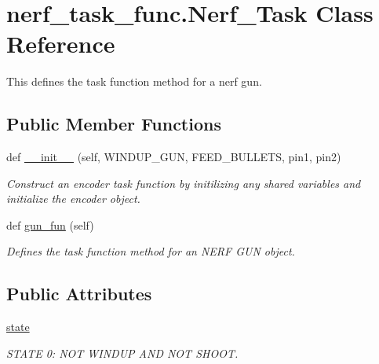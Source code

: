 \hypertarget{classnerf__task__func_1_1Nerf__Task}{}\section{nerf\+\_\+task\+\_\+func.\+Nerf\+\_\+\+Task Class Reference}
\label{classnerf__task__func_1_1Nerf__Task}


This defines the task function method for a nerf gun.  


\subsection*{Public Member Functions}
\begin{DoxyCompactItemize}
\item 
def \hyperlink{classnerf__task__func_1_1Nerf__Task_a073f35baf65e032a886807ea445eb8a9}{\+\_\+\+\_\+init\+\_\+\+\_\+} (self, W\+I\+N\+D\+U\+P\+\_\+\+G\+UN, F\+E\+E\+D\+\_\+\+B\+U\+L\+L\+E\+TS, pin1, pin2)
\begin{DoxyCompactList}\small\item\em Construct an encoder task function by initilizing any shared variables and initialize the encoder object. \end{DoxyCompactList}\item 
def \hyperlink{classnerf__task__func_1_1Nerf__Task_aa555816a1725c1f62a36e28b6d70ea87}{gun\+\_\+fun} (self)\hypertarget{classnerf__task__func_1_1Nerf__Task_aa555816a1725c1f62a36e28b6d70ea87}{}\label{classnerf__task__func_1_1Nerf__Task_aa555816a1725c1f62a36e28b6d70ea87}

\begin{DoxyCompactList}\small\item\em Defines the task function method for an N\+E\+RF G\+UN object. \end{DoxyCompactList}\end{DoxyCompactItemize}
\subsection*{Public Attributes}
\begin{DoxyCompactItemize}
\item 
\hyperlink{classnerf__task__func_1_1Nerf__Task_aba96bf43bf05d15d36252b89611ebdd4}{state}
\begin{DoxyCompactList}\small\item\em S\+T\+A\+TE 0\+: N\+OT W\+I\+N\+D\+UP A\+ND N\+OT S\+H\+O\+OT. \end{DoxyCompactList}\end{DoxyCompactItemize}



